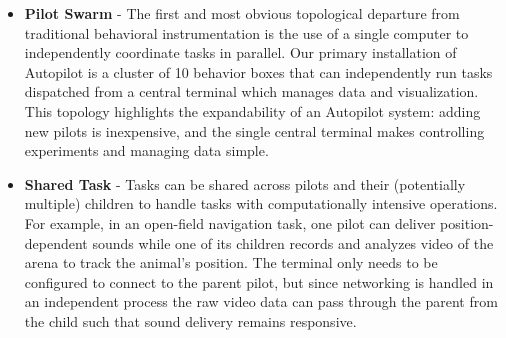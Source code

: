 \begin{itemize}
    \item \textbf{Pilot Swarm} - The first and most obvious topological departure from traditional behavioral instrumentation is the use of a single computer to independently coordinate tasks in parallel. Our primary installation of Autopilot is a cluster of 10 behavior boxes that can independently run tasks dispatched from a central terminal which manages data and visualization. This topology highlights the expandability of an Autopilot system: adding new pilots is inexpensive, and the single central terminal makes controlling experiments and managing data simple.
    \item \textbf{Shared Task} -  Tasks can be shared across pilots and their (potentially multiple) children to handle tasks with computationally intensive operations. For example, in an open-field navigation task, one pilot can deliver position-dependent sounds while one of its children records and analyzes video of the arena to track the animal's position. The terminal only needs to be configured to connect to the parent pilot, but since networking is handled in an independent process the raw video data can pass through the parent from the child such that sound delivery remains responsive.

\end{itemize}
